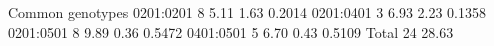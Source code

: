 \documentclass[letterpaper,10pt,english,openany,oneside]{sphinxmanual}
\begin{document}
\begin{sphinxVerbatim}[commandchars=\\\{\}]
\PYGZhy{}\PYGZhy{}\PYGZhy{}\PYGZhy{}\PYGZhy{}\PYGZhy{}\PYGZhy{}\PYGZhy{}\PYGZhy{}\PYGZhy{}\PYGZhy{}\PYGZhy{}\PYGZhy{}\PYGZhy{}\PYGZhy{}\PYGZhy{}\PYGZhy{}\PYGZhy{}\PYGZhy{}\PYGZhy{}\PYGZhy{}\PYGZhy{}\PYGZhy{}\PYGZhy{}\PYGZhy{}\PYGZhy{}\PYGZhy{}\PYGZhy{}\PYGZhy{}\PYGZhy{}\PYGZhy{}\PYGZhy{}\PYGZhy{}\PYGZhy{}\PYGZhy{}\PYGZhy{}\PYGZhy{}\PYGZhy{}\PYGZhy{}\PYGZhy{}\PYGZhy{}\PYGZhy{}\PYGZhy{}\PYGZhy{}\PYGZhy{}\PYGZhy{}\PYGZhy{}\PYGZhy{}\PYGZhy{}\PYGZhy{}\PYGZhy{}\PYGZhy{}\PYGZhy{}\PYGZhy{}\PYGZhy{}\PYGZhy{}\PYGZhy{}\PYGZhy{}\PYGZhy{}\PYGZhy{}\PYGZhy{}\PYGZhy{}\PYGZhy{}\PYGZhy{}\PYGZhy{}\PYGZhy{}\PYGZhy{}\PYGZhy{}\PYGZhy{}\PYGZhy{}\PYGZhy{}\PYGZhy{}\PYGZhy{}\PYGZhy{}\PYGZhy{}\PYGZhy{}\PYGZhy{}\PYGZhy{}
Common genotypes
         0201:0201           8        5.11        1.63        0.2014
         0201:0401           3        6.93        2.23        0.1358
         0201:0501           8        9.89        0.36        0.5472
         0401:0501           5        6.70        0.43        0.5109
             Total          24       28.63
\PYGZhy{}\PYGZhy{}\PYGZhy{}\PYGZhy{}\PYGZhy{}\PYGZhy{}\PYGZhy{}\PYGZhy{}\PYGZhy{}\PYGZhy{}\PYGZhy{}\PYGZhy{}\PYGZhy{}\PYGZhy{}\PYGZhy{}\PYGZhy{}\PYGZhy{}\PYGZhy{}\PYGZhy{}\PYGZhy{}\PYGZhy{}\PYGZhy{}\PYGZhy{}\PYGZhy{}\PYGZhy{}\PYGZhy{}\PYGZhy{}\PYGZhy{}\PYGZhy{}\PYGZhy{}\PYGZhy{}\PYGZhy{}\PYGZhy{}\PYGZhy{}\PYGZhy{}\PYGZhy{}\PYGZhy{}\PYGZhy{}\PYGZhy{}\PYGZhy{}\PYGZhy{}\PYGZhy{}\PYGZhy{}\PYGZhy{}\PYGZhy{}\PYGZhy{}\PYGZhy{}\PYGZhy{}\PYGZhy{}\PYGZhy{}\PYGZhy{}\PYGZhy{}\PYGZhy{}\PYGZhy{}\PYGZhy{}\PYGZhy{}\PYGZhy{}\PYGZhy{}\PYGZhy{}\PYGZhy{}\PYGZhy{}\PYGZhy{}\PYGZhy{}\PYGZhy{}\PYGZhy{}\PYGZhy{}\PYGZhy{}\PYGZhy{}\PYGZhy{}\PYGZhy{}\PYGZhy{}\PYGZhy{}\PYGZhy{}\PYGZhy{}\PYGZhy{}\PYGZhy{}\PYGZhy{}\PYGZhy{}
\end{sphinxVerbatim}
\end{document}
